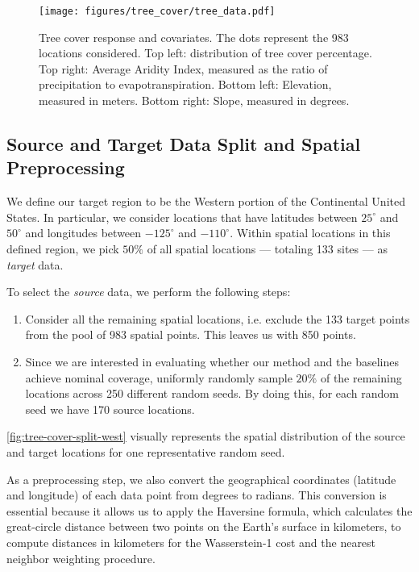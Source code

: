 \begin{figure*}[!ht]
    \centering
\texttt{[image: figures/tree\_cover/tree\_data.pdf]}
    \caption{Tree cover response and covariates. The dots represent the 983 locations considered. Top left: distribution of tree cover percentage. Top right: Average Aridity Index, measured as the ratio of precipitation to evapotranspiration. Bottom left: Elevation, measured in meters. Bottom right: Slope, measured in degrees.}
    \label{fig:tree-cover-data}
\end{figure*}

\subsection{Source and Target Data Split and Spatial Preprocessing}
We define our target region to be the Western portion of the Continental United States. In particular, we consider locations that have latitudes between $25^\circ$ and $50^\circ$ and longitudes between $-125^\circ$ and $-110^\circ$. Within spatial locations in this defined region, we pick $50\%$ of all spatial locations --- totaling 133 sites --- as \textit{target} data.

To select the \textit{source} data, we perform the following steps:
\begin{enumerate}
    \item Consider all the remaining spatial locations, i.e. exclude the 133 target points from the pool of 983 spatial points. This leaves us with 850 points.
    \item Since we are interested in evaluating whether our method and the baselines achieve nominal coverage, uniformly randomly sample $20\%$ of the remaining locations across 250 different random seeds. By doing this, for each random seed we have 170 source locations.
\end{enumerate}

\cref{fig:tree-cover-split-west} visually represents the spatial distribution of the source and target locations for one representative random seed.

As a preprocessing step, we also convert the geographical coordinates (latitude and longitude) of each data point from degrees to radians. This conversion is essential because it allows us to apply the Haversine formula, which calculates the great-circle distance between two points on the Earth's surface in kilometers, to compute distances in kilometers for the Wasserstein-1 cost and the nearest neighbor weighting procedure.


